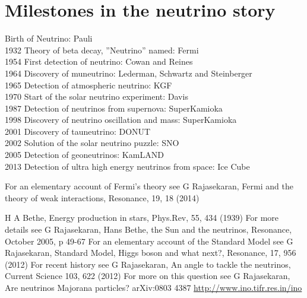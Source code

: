 \section*{Milestones in the neutrino story}

 Birth of Neutrino: Pauli\\
1932 Theory of beta decay, ”Neutrino” named: Fermi\\
1954 First detection of neutrino: Cowan and Reines\\
1964 Discovery of muneutrino: Lederman, Schwartz and Steinberger\\
1965 Detection of atmospheric neutrino: KGF\\
1970 Start of the solar neutrino experiment: Davis\\
1987 Detection of neutrinos from supernova: SuperKamioka\\
1998 Discovery of neutrino oscillation and mass: SuperKamioka\\
2001 Discovery of tauneutrino: DONUT\\
2002 Solution of the solar neutrino puzzle: SNO\\
2005 Detection of geoneutrinos: KamLAND\\
2013 Detection of ultra high energy neutrinos from space: Ice Cube

\newpage

\begin{thebibliography}{99}
\bibitem{} For an elementary account of Fermi’s theory see G Rajasekaran,
Fermi and the theory of weak interactions, Resonance, 19, 18
(2014)

\bibitem{} H A Bethe, Energy production in stars, Phys.Rev, 55, 434
(1939)
\bibitem{} For more details see G Rajasekaran, Hans Bethe, the Sun and
the neutrinos, Resonance, October 2005, p 49-67
\bibitem{} For an elementary account of the Standard Model see G
Rajasekaran, Standard Model, Higgs boson and what next?,
Resonance, 17, 956 (2012)
\bibitem{} For recent history see G Rajasekaran, An angle to tackle the
neutrinos, Current Science 103, 622 (2012)
\bibitem{} For more on this question see G Rajasekaran, Are neutrinos
Majorana particles? arXiv:0803 4387
\bibitem{} \url{http://www.ino.tifr.res.in/ino}

\end{thebibliography}
